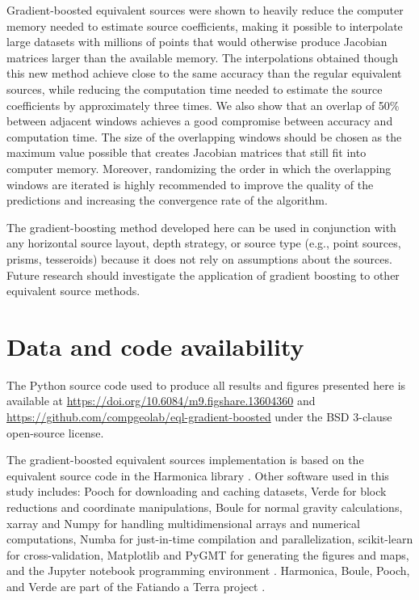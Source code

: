 Gradient-boosted equivalent sources were shown to heavily reduce the computer
memory needed to estimate source coefficients, making it possible to
interpolate large datasets with millions of points that would otherwise produce
Jacobian matrices larger than the available memory.
The interpolations obtained though this new method achieve close to the same
accuracy than the regular equivalent sources, while reducing the computation
time needed to estimate the source coefficients by approximately three times.
We also show that an overlap of 50\% between adjacent windows achieves a good
compromise between accuracy and computation time.
The size of the overlapping windows should be chosen as the maximum value
possible that creates Jacobian matrices that still fit into computer memory.
Moreover, randomizing the order in which the overlapping windows are iterated
is highly recommended to improve the quality of the predictions and increasing
the convergence rate of the algorithm.

The gradient-boosting method developed here can be used in conjunction with any
horizontal source layout, depth strategy, or source type (e.g., point sources,
prisms, tesseroids) because it does not rely on assumptions about the sources.
Future research should investigate the application of gradient boosting to
other equivalent source methods.


\section{Data and code availability}

The Python source code used to produce all results and figures presented here
is available at
\url{https://doi.org/10.6084/m9.figshare.13604360} and
\url{https://github.com/compgeolab/eql-gradient-boosted}
under the BSD 3-clause open-source license.

The gradient-boosted equivalent sources implementation is based on the
equivalent source code in the Harmonica library \citep{harmonica2020}.
Other software used in this study includes:
Pooch \citep{pooch2020} for downloading and caching datasets,
Verde \citep{verde2018} for block reductions and coordinate manipulations,
Boule \citep{boule2020} for normal gravity calculations,
xarray \citep{xarray2017} and Numpy \citep{numpy2020} for handling
multidimensional arrays and numerical computations,
Numba \citep{numba2015} for just-in-time compilation and parallelization,
scikit-learn \citep{sklearn2011} for cross-validation,
Matplotlib \citep{matplotlib2007} and PyGMT \citep{pygmt2020} for generating
the figures and maps,
and the Jupyter notebook programming environment \citep{jupyter2016}.
Harmonica, Boule, Pooch, and Verde are part of the Fatiando a Terra project
\citep{fatiando2013}.

